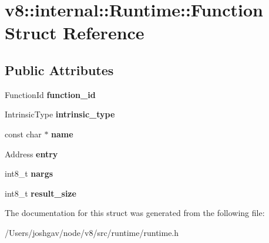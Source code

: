\hypertarget{structv8_1_1internal_1_1_runtime_1_1_function}{}\section{v8\+:\+:internal\+:\+:Runtime\+:\+:Function Struct Reference}
\label{structv8_1_1internal_1_1_runtime_1_1_function}
\subsection*{Public Attributes}
\begin{DoxyCompactItemize}
\item 
Function\+Id {\bfseries function\+\_\+id}\hypertarget{structv8_1_1internal_1_1_runtime_1_1_function_a713ac5d134215cd5c1e4e4414a530e63}{}\label{structv8_1_1internal_1_1_runtime_1_1_function_a713ac5d134215cd5c1e4e4414a530e63}

\item 
Intrinsic\+Type {\bfseries intrinsic\+\_\+type}\hypertarget{structv8_1_1internal_1_1_runtime_1_1_function_aa1d4b01b27002015b6148f7097cee1ad}{}\label{structv8_1_1internal_1_1_runtime_1_1_function_aa1d4b01b27002015b6148f7097cee1ad}

\item 
const char $\ast$ {\bfseries name}\hypertarget{structv8_1_1internal_1_1_runtime_1_1_function_a8d7a71e9b81c63cef8006a5e8580745f}{}\label{structv8_1_1internal_1_1_runtime_1_1_function_a8d7a71e9b81c63cef8006a5e8580745f}

\item 
Address {\bfseries entry}\hypertarget{structv8_1_1internal_1_1_runtime_1_1_function_a9c2bb17d76a986835dcf43412bf5d3d0}{}\label{structv8_1_1internal_1_1_runtime_1_1_function_a9c2bb17d76a986835dcf43412bf5d3d0}

\item 
int8\+\_\+t {\bfseries nargs}\hypertarget{structv8_1_1internal_1_1_runtime_1_1_function_a4b74b29f3dea1980d8e18d6bddb1f49b}{}\label{structv8_1_1internal_1_1_runtime_1_1_function_a4b74b29f3dea1980d8e18d6bddb1f49b}

\item 
int8\+\_\+t {\bfseries result\+\_\+size}\hypertarget{structv8_1_1internal_1_1_runtime_1_1_function_a47a801f6f15127121bac4e780bbb5e5f}{}\label{structv8_1_1internal_1_1_runtime_1_1_function_a47a801f6f15127121bac4e780bbb5e5f}

\end{DoxyCompactItemize}


The documentation for this struct was generated from the following file\+:\begin{DoxyCompactItemize}
\item 
/\+Users/joshgav/node/v8/src/runtime/runtime.\+h\end{DoxyCompactItemize}

